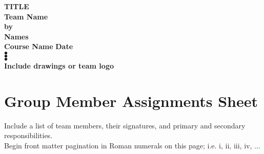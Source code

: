 \documentclass[conf]{new-aiaa}
\begin{document}
\begin{titlepage}
    \begin{center}
        \vspace*{1cm}
        \large
        \textbf{TITLE} \\
        \vspace{0.5cm}
        \textbf{Team Name} \\
        \vspace{0.5cm}
        \normalsize
        \textbf{by} \\
        \vspace{0.5cm}
        \textbf{Names} \\
        \vspace{0.5cm}
        \textbf{Course Name}
        \vspace{0.5cm}
        \textbf{Date} \\
        \vspace{2.5cm}
        $\bullet$\\
        \vspace{2.5cm}
        $\bullet$\\
        \vspace{2.5cm}
        $\bullet$\\
        \vspace{1.75cm}
        \textbf{Include drawings or team logo}
    \end{center}
\end{titlepage}

\newpage
\section{Group Member Assignments Sheet}
Include  a  list  of  team  members,  their  signatures,  and  primary  and  secondary  responsibilities.\\
Begin front matter pagination in Roman numerals on this page; i.e. i, ii, iii, iv, ...
\newpage

\end{document}
